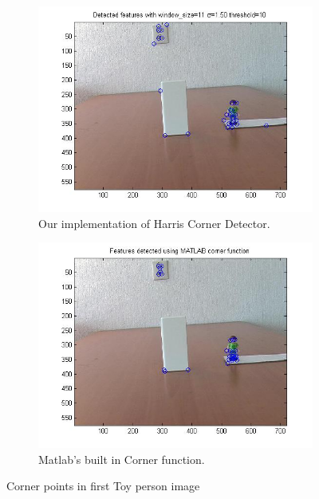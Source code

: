 \documentclass[11pt]{article}
\begin{document}
\begin{figure}[H] \centering
	\begin{subfigure}{.5\textwidth} \centering
		\includegraphics[width=1\textwidth]{imgs/ourCorners_person.jpg}
		\caption{Our implementation of Harris Corner Detector.}
		\label{fig:ourCorners_person}
	\end{subfigure}%
	\begin{subfigure}{.5\textwidth}	\centering
		\includegraphics[width=1\textwidth]{imgs/matlabCorners_person.jpg}
		\caption{Matlab's built in Corner function.}
		\label{fig:matlabCorners_person}
	\end{subfigure}
	\caption{Corner points in first Toy person image}
	\label{fig:corners_person}
\end{figure}
\end{document}
